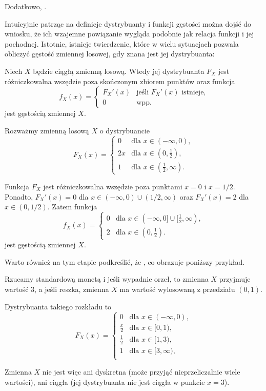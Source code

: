 Dodatkowo, .
\bigskip

Intuicyjnie patrząc na definicje dystrybuanty i funkcji gęstości można dojść do wniosku, że ich wzajemne powiązanie wygląda podobnie jak relacja funkcji i jej pochodnej. Istotnie, istnieje twierdzenie, które w wielu sytuacjach pozwala obliczyć gęstość zmiennej losowej, gdy znana jest jej dystrybuanta:

Niech $X$ będzie ciągłą zmienną losową. Wtedy jej dystrybuanta $F_X$ jest różniczkowalna wszędzie poza skończonym zbiorem punktów oraz funkcja
$$
f_X(x) = \begin{cases}
    F_X'(x) & \text{jeśli } F_X'(x) \text{ istnieje,} \\
    0 & \text{wpp.}
\end{cases}
$$
jest gęstością zmiennej $X$.

\begin{example}
    Rozważmy zmienną losową $X$ o dystrybuancie
    $$
    F_X(x) = \begin{cases}
        0 & \text{dla } x \in (-\infty, 0), \\
        2x & \text{dla } x \in (0, \frac{1}{2}), \\
        1 & \text{dla } x \in (\frac{1}{2}, \infty).
    \end{cases}
    $$

    Funkcja $F_X$ jest różniczkowalna wszędzie poza punktami $x = 0$ i $x = 1/2$. Ponadto, $F_X'(x) = 0$ dla $x \in (-\infty, 0) \cup (1/2, \infty)$ oraz $F_X'(x) = 2$ dla $x \in (0, 1/2)$. Zatem funkcja
    $$
    f_X(x) = \begin{cases}
        0 & \text{dla } x \in (-\infty, 0] \cup [\frac{1}{2}, \infty), \\ 
        2 & \text{dla } x \in (0, \frac{1}{2}).
    \end{cases}
    $$
    jest gęstością zmiennej $X$.
\end{example}

Warto również na tym etapie podkreślić, że , co obrazuje poniższy przykład.

\begin{example}
    Rzucamy standardową monetą i jeśli wypadnie orzeł, to zmienna $X$ przyjmuje wartość 3, a jeśli reszka, zmienna $X$ ma wartość wylosowaną z przedziału $(0, 1)$.

    Dystrybuanta takiego rozkładu to
    $$
    F_X(x) = \begin{cases}
        0 & \text{dla } x \in (-\infty, 0), \\
        \frac{x}{2} & \text{dla } x \in [0, 1), \\
        \frac{1}{2} & \text{dla } x \in [1, 3), \\
        1 & \text{dla } x \in [3, \infty), \\
    \end{cases}
    $$

    Zmienna $X$ nie jest więc ani dyskretna (może przyjąć nieprzeliczalnie wiele wartości), ani ciągła (jej dystrybuanta nie jest ciągła w punkcie $x = 3$).
\end{example}

